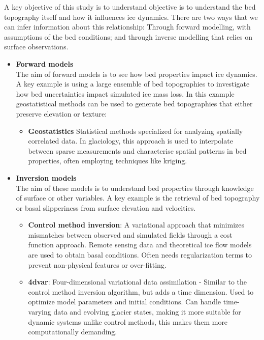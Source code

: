 A key objective of this study is to understand objective is to understand the bed topography itself and how it influences ice dynamics. There are two ways that we can infer information about this relationship: Through forward modelling, with assumptions of the bed conditions; and through inverse modelling that relies on surface observations.
\begin{itemize}
    \item\textbf{Forward models}\\
    The aim of forward models is to see how bed properties impact ice dynamics. A key example is using a large ensemble of bed topographies to investigate how bed uncertainties impact simulated ice mass loss. In this example geostatistical methods can be used to generate bed topographies that either preserve elevation or texture:    
    \begin{itemize}
            \item\textbf{Geostatistics} Statistical methods specialized for analyzing spatially correlated data. In glaciology, this approach is used to interpolate between sparse measurements and characterise spatial patterns in bed properties, often employing techniques like kriging\cite{Mackie_2020}.

    \end{itemize}

    \item\textbf{Inversion models}\\
    The aim of these models is to understand bed properties through knowledge of surface or other variables. A key example is the retrieval of bed topography or basal slipperiness from surface elevation and velocities.

        \begin{itemize}
            \item\textbf{Control method inversion}: A variational approach that minimizes mismatches between observed and simulated fields through a cost function approach. Remote sensing data and theoretical ice flow models are used to obtain basal conditions\cite{deRydt_2013}. Often needs regularization terms to prevent non-physical features or over-fitting\cite{Morlighem_Goldberg_2024}.

            \item\textbf{4dvar}: Four-dimensional variational data assimilation - Similar to the control method inversion algorithm, but adds a time dimension. Used to optimize model parameters and initial conditions\cite{Morlighem_Goldberg_2024}. Can handle time-varying data and evolving glacier states, making it more suitable for dynamic systems unlike control methods, this makes them more computationally demanding\cite{Morlighem_Goldberg_2024}.


\end{itemize}
\end{itemize}
